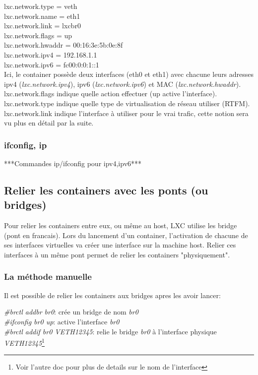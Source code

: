 \documentclass{article}
\begin{document}
\noindent
lxc.network.type = veth\\
lxc.network.name = eth1\\
lxc.network.link = lxcbr0\\
lxc.network.flags = up\\
lxc.network.hwaddr = 00:16:3e:5b:0e:8f\\
lxc.network.ipv4 = 192.168.1.1\\
lxc.network.ipv6 = fc00:0:0:1::1\\

Ici, le container poss\`ede deux interfaces (eth0 et eth1) avec chacune leurs adresses ipv4 (\emph{lxc.network.ipv4}),
ipv6 (\emph{lxc.network.ipv6}) et MAC (\emph{lxc.network.hwaddr}).\\
lxc.network.flags indique quelle action effectuer (up active l'interface).\\
lxc.network.type indique quelle type de virtualisation de réseau utiliser (RTFM).\\
lxc.network.link indique l'interface \`a utiliser pour le vrai trafic, cette notion sera vu plus en d\'etail par la suite.\\

\subsubsection{ifconfig, ip}

***Commandes ip/ifconfig pour ipv4,ipv6***

\subsection{Relier les containers avec les ponts (ou bridges)}

Pour relier les containers entre eux, ou m\^eme au host, LXC utilise les bridge (pont en francais). Lors du
lancement d'un container, l'activation de chacune de ses interfaces virtuelles va cr\'eer une interface sur la machine
host. Relier ces interfaces \`a un m\^eme pont permet de relier les containers "physiquement".

\subsubsection{La m\'ethode manuelle}

Il est possible de relier les containers aux bridges apres les avoir lancer:

\noindent
\emph{\#brctl addbr br0}: cr\'ee un bridge de nom \emph{br0}\\
\emph{\#ifconfig br0 up}: active l'interface \emph{br0}\\
\emph{\#brctl addif br0 VETH12345}: relie le bridge \emph{br0} \`a l'interface physique \emph{VETH12345}\footnote{Voir l'autre doc pour plus de details sur le nom de l'interface}\\
\end{document}
